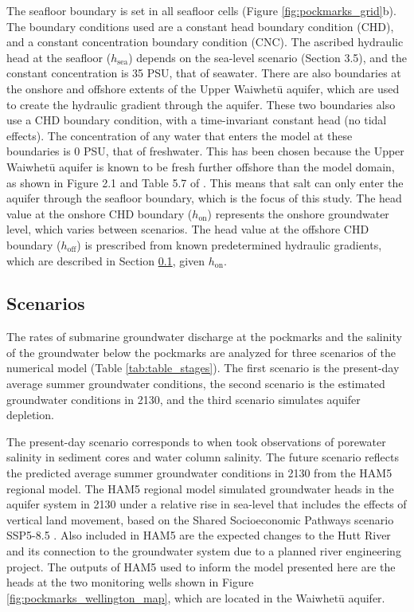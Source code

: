 \documentclass[draft, 10pt]{agujournal2019}
\begin{document}
The seafloor boundary is set in all seafloor cells (Figure \ref{fig:pockmarks_grid}b).
The boundary conditions used are a constant head boundary condition (CHD), and a constant concentration boundary condition (CNC).
The ascribed hydraulic head at the seafloor ($h_{\mathrm{sea}}$) depends on the sea-level scenario (Section 3.5), and the constant concentration is 35 PSU, that of seawater.
There are also boundaries at the onshore and offshore extents of the Upper Waiwhetū aquifer, which are used to create the hydraulic gradient through the aquifer.
These two boundaries also use a CHD boundary condition, with a time-invariant constant head (no tidal effects).
The concentration of any water that enters the model at these boundaries is 0 PSU, that of freshwater.
This has been chosen because the Upper Waiwhetū aquifer is known to be fresh further offshore than the model domain,
as shown in Figure 2.1 and Table 5.7 of .
This means that salt can only enter the aquifer through the seafloor boundary, which is the focus of this study.
The head value at the onshore CHD boundary ($h_{\mathrm{on}}$) represents the onshore groundwater level, which varies between scenarios.
The head value at the offshore CHD boundary ($h_{\mathrm{off}}$) is prescribed from known predetermined hydraulic gradients,
which are described in Section \ref{scenarios}, given $h_{\mathrm{on}}$.

\subsection{Scenarios}\label{scenarios}
The rates of submarine groundwater discharge at the pockmarks and the salinity of the groundwater below the pockmarks are analyzed for three scenarios of the numerical model (Table \ref{tab:table_stages}).
The first scenario is the present-day average summer groundwater conditions, the second scenario is the estimated groundwater conditions in 2130,
and the third scenario simulates aquifer depletion.

The present-day scenario corresponds to when  took observations of porewater salinity in sediment cores and water column salinity.
The future scenario reflects the predicted average summer groundwater conditions in 2130 from the HAM5 regional model.
The HAM5 regional model simulated groundwater heads in the aquifer system in 2130 under a relative rise in sea-level that includes the effects of vertical land movement,
based on the Shared Socioeconomic Pathways scenario SSP5-8.5 \cite{bennett_hutt_2024}.
Also included in HAM5 are the expected changes to the Hutt River and its connection to the groundwater system due to a planned river engineering project.
The outputs of HAM5 used to inform the model presented here are the heads at the two monitoring wells shown in Figure \ref{fig:pockmarks_wellington_map},
which are located in the Waiwhetū aquifer.
\end{document}
